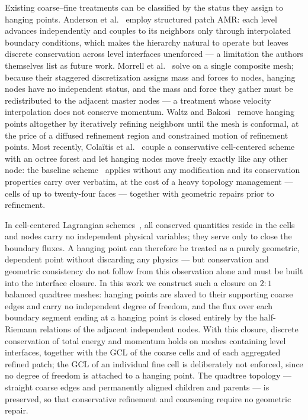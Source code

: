 \documentclass[a4paper]{cas-sc}
\begin{document}
Existing coarse--fine treatments can be classified by the status they assign to hanging points. Anderson et al.~\cite{anderson2004arbitrary} employ structured patch AMR: each level advances independently and couples to its neighbors only through interpolated boundary conditions, which makes the hierarchy natural to operate but leaves discrete conservation across level interfaces unenforced --- a limitation the authors themselves list as future work. Morrell et al.~\cite{morrell2007cell} solve on a single composite mesh; because their staggered discretization assigns mass and forces to nodes, hanging nodes have no independent status, and the mass and force they gather must be redistributed to the adjacent master nodes --- a treatment whose velocity interpolation does not conserve momentum. Waltz and Bakosi~\cite{waltz2018coupled} remove hanging points altogether by iteratively refining neighbors until the mesh is conformal, at the price of a diffused refinement region and constrained motion of refinement points. Most recently, Cola{\"i}tis et al.~\cite{colaitis2026cell} couple a conservative cell-centered scheme with an octree forest and let hanging nodes move freely exactly like any other node: the baseline scheme~\cite{georges2016three} applies without any modification and its conservation properties carry over verbatim, at the cost of a heavy topology management --- cells of up to twenty-four faces --- together with geometric repairs prior to refinement.

In cell-centered Lagrangian schemes~\cite{maire2007SIAM,maire2009high}, all conserved quantities reside in the cells and nodes carry no independent physical variables; they serve only to close the boundary fluxes. A hanging point can therefore be treated as a purely geometric, dependent point without discarding any physics --- but conservation and geometric consistency do not follow from this observation alone and must be built into the interface closure. In this work we construct such a closure on $2\!:\!1$ balanced quadtree meshes: hanging points are slaved to their supporting coarse edges and carry no independent degree of freedom, and the flux over each boundary segment ending at a hanging point is closed entirely by the half-Riemann relations of the adjacent independent nodes. With this closure, discrete conservation of total energy and momentum holds on meshes containing level interfaces, together with the GCL of the coarse cells and of each aggregated refined patch; the GCL of an individual fine cell is deliberately not enforced, since no degree of freedom is attached to a hanging point. The quadtree topology --- straight coarse edges and permanently aligned children and parents --- is preserved, so that conservative refinement and coarsening require no geometric repair.
\end{document}
